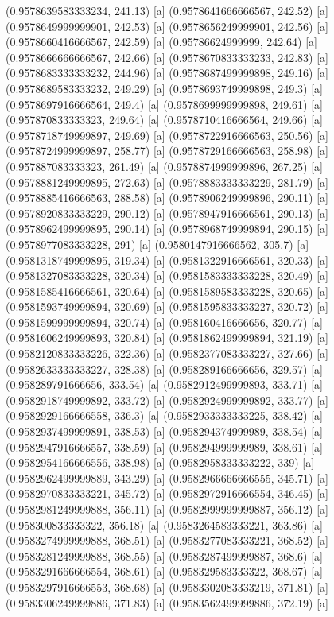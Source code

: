 {{{(0.9578639583333234, 241.13) [a] 
(0.9578641666666567, 242.52) [a] 
(0.9578649999999901, 242.53) [a] 
(0.9578656249999901, 242.56) [a] 
(0.9578660416666567, 242.59) [a] 
(0.95786624999999, 242.64) [a] 
(0.9578666666666567, 242.66) [a] 
(0.9578670833333233, 242.83) [a] 
(0.9578683333333232, 244.96) [a] 
(0.9578687499999898, 249.16) [a] 
(0.9578689583333232, 249.29) [a] 
(0.9578693749999898, 249.3) [a] 
(0.9578697916666564, 249.4) [a] 
(0.9578699999999898, 249.61) [a] 
(0.957870833333323, 249.64) [a] 
(0.9578710416666564, 249.66) [a] 
(0.9578718749999897, 249.69) [a] 
(0.9578722916666563, 250.56) [a] 
(0.9578724999999897, 258.77) [a] 
(0.9578729166666563, 258.98) [a] 
(0.957887083333323, 261.49) [a] 
(0.9578874999999896, 267.25) [a] 
(0.9578881249999895, 272.63) [a] 
(0.9578883333333229, 281.79) [a] 
(0.9578885416666563, 288.58) [a] 
(0.9578906249999896, 290.11) [a] 
(0.9578920833333229, 290.12) [a] 
(0.9578947916666561, 290.13) [a] 
(0.9578962499999895, 290.14) [a] 
(0.9578968749999894, 290.15) [a] 
(0.9578977083333228, 291) [a] 
(0.9580147916666562, 305.7) [a] 
(0.9581318749999895, 319.34) [a] 
(0.9581322916666561, 320.33) [a] 
(0.9581327083333228, 320.34) [a] 
(0.9581583333333228, 320.49) [a] 
(0.9581585416666561, 320.64) [a] 
(0.9581589583333228, 320.65) [a] 
(0.9581593749999894, 320.69) [a] 
(0.9581595833333227, 320.72) [a] 
(0.9581599999999894, 320.74) [a] 
(0.958160416666656, 320.77) [a] 
(0.9581606249999893, 320.84) [a] 
(0.9581862499999894, 321.19) [a] 
(0.9582120833333226, 322.36) [a] 
(0.9582377083333227, 327.66) [a] 
(0.9582633333333227, 328.38) [a] 
(0.958289166666656, 329.57) [a] 
(0.958289791666656, 333.54) [a] 
(0.9582912499999893, 333.71) [a] 
(0.9582918749999892, 333.72) [a] 
(0.9582924999999892, 333.77) [a] 
(0.9582929166666558, 336.3) [a] 
(0.9582933333333225, 338.42) [a] 
(0.9582937499999891, 338.53) [a] 
(0.958294374999989, 338.54) [a] 
(0.9582947916666557, 338.59) [a] 
(0.958294999999989, 338.61) [a] 
(0.9582954166666556, 338.98) [a] 
(0.9582958333333222, 339) [a] 
(0.9582962499999889, 343.29) [a] 
(0.9582966666666555, 345.71) [a] 
(0.9582970833333221, 345.72) [a] 
(0.9582972916666554, 346.45) [a] 
(0.9582981249999888, 356.11) [a] 
(0.9582999999999887, 356.12) [a] 
(0.958300833333322, 356.18) [a] 
(0.9583264583333221, 363.86) [a] 
(0.9583274999999888, 368.51) [a] 
(0.9583277083333221, 368.52) [a] 
(0.9583281249999888, 368.55) [a] 
(0.9583287499999887, 368.6) [a] 
(0.9583291666666554, 368.61) [a] 
(0.958329583333322, 368.67) [a] 
(0.9583297916666553, 368.68) [a] 
(0.9583302083333219, 371.81) [a] 
(0.9583306249999886, 371.83) [a] 
(0.9583562499999886, 372.19) [a] 
}}}
